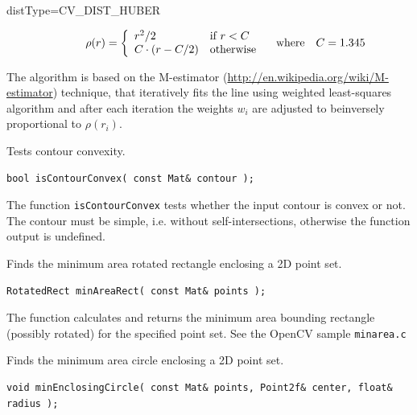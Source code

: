 \begin{description}
\begin{description}
\item[distType=CV\_DIST\_HUBER]
\[ \rho(r) = \left\{ \begin{array}{l l} r^2/2 & \mbox{if $r < C$}\\ C \cdot (r-C/2) & \mbox{otherwise}\\ \end{array} \right.  \quad \text{where} \quad C=1.345
\]
\end{description}

The algorithm is based on the M-estimator (\url{http://en.wikipedia.org/wiki/M-estimator}) technique, that iteratively fits the line using weighted least-squares algorithm and after each iteration the weights $w_i$ are adjusted to beinversely proportional to $\rho(r_i)$. 


\label{isContourConvex}
Tests contour convexity.

\begin{lstlisting}
bool isContourConvex( const Mat& contour );
\end{lstlisting}
\begin{description}
\end{description}

The function \texttt{isContourConvex} tests whether the input contour is convex or not. The contour must be simple, i.e. without self-intersections, otherwise the function output is undefined.


\label{minAreaRect}
Finds the minimum area rotated rectangle enclosing a 2D point set.

\begin{lstlisting}
RotatedRect minAreaRect( const Mat& points );
\end{lstlisting}
\begin{description}
\end{description}

The function calculates and returns the minimum area bounding rectangle (possibly rotated) for the specified point set. See the OpenCV sample \texttt{minarea.c}

\label{minEnclosingCircle}
Finds the minimum area circle enclosing a 2D point set.

\begin{lstlisting}
void minEnclosingCircle( const Mat& points, Point2f& center, float& radius );    
\end{lstlisting}
\begin{description}
\end{description}


\end{description}
